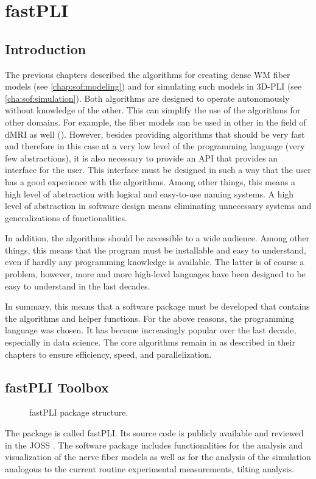 \setcounter{chapter}{5}
\chapter{\acs{fastPLI}}
\label{chap:Software}
% 
% 
% 
\section{Introduction}\label{sec:fastpliIntro}
%
The previous chapters described the algorithms for creating dense \ac{WM} fiber models (see \cref{chap:sof:modeling}) and for simulating such models in \ac{3D-PLI} (see \cref{cha:sof:simulation}).
Both algorithms are designed to operate autonomously without knowledge of the other.
This can simplify the use of the algorithms for other domains. For example, the fiber models can be used in other in the field of \ac{dMRI} as well (\cite{Ginsburger2019,ginsburgerDis2019}).
However, besides providing algorithms that should be very fast and therefore in this case at a very low level of the programming language (very few abstractions), it is also necessary to provide an API that provides an interface for the user.
This interface must be designed in such a way that the user has a good experience with the algorithms.
Among other things, this means a high level of abstraction with logical and easy-to-use naming systems.
A high level of abstraction in software design means eliminating unnecessary systems and generalizations of functionalities.
\par
%
In addition, the algorithms should be accessible to a wide audience.
Among other things, this means that the program must be installable and easy to understand, even if hardly any programming knowledge is available.
The latter is of course a problem, however, more and more high-level languages have been designed to be easy to understand in the last decades.
\par
%
In summary, this means that a software package must be developed that contains the algorithms and helper functions.
For the above reasons, the \python{} programming language was chosen.
It has become increasingly popular over the last decade, especially in data science.
The core algorithms remain in \cpp{} as described in their chapters to ensure efficiency, speed, and parallelization.
%
\section{fastPLI Toolbox}
%
\begin{figure}[!ht]
\centering
{}
\caption{\acs{fastPLI} package structure.}
\label{fig:fastpli}
\end{figure}
%
The \python{} package is called  \ac{fastPLI}.
Its source code is publicly available and reviewed in the \ac{JOSS} \cite{fastpli,Matuschke2021}.
The software package includes functionalities for the analysis and visualization of the nerve fiber models as well as for the analysis of the simulation analogous to the current routine experimental measurements, \eg{} tilting analysis.
%
%
%
